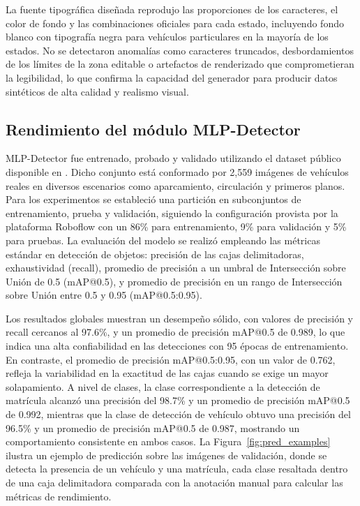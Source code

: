 La fuente tipográfica diseñada reprodujo las proporciones de los caracteres, el color de fondo y las combinaciones oficiales para cada estado, incluyendo fondo blanco con tipografía negra para vehículos particulares en la mayoría de los estados. No se detectaron anomalías como caracteres truncados, desbordamientos de los límites de la zona editable o artefactos de renderizado que comprometieran la legibilidad, lo que confirma la capacidad del generador para producir datos sintéticos de alta calidad y realismo visual.

\subsection*{Rendimiento del módulo MLP-Detector}
MLP-Detector fue entrenado, probado y validado utilizando el dataset público disponible en \cite{roboflow_licenseplate2026}. Dicho conjunto está conformado por 2,559 imágenes de vehículos reales en diversos escenarios como aparcamiento, circulación y primeros planos. Para los experimentos se estableció una partición en subconjuntos de entrenamiento, prueba y validación, siguiendo la configuración provista por la plataforma Roboflow con un 86\% para entrenamiento, 9\% para validación y 5\% para pruebas. La evaluación del modelo se realizó empleando las métricas estándar en detección de objetos: precisión de las cajas delimitadoras, exhaustividad (recall), promedio de precisión a un umbral de Intersección sobre Unión de 0.5 (mAP@0.5), y promedio de precisión en un rango de Intersección sobre Unión entre 0.5 y 0.95 (mAP@0.5:0.95).%

Los resultados globales muestran un desempeño sólido, con valores de precisión y recall cercanos al 97.6\%, y un promedio de precisión mAP@0.5 de 0.989, lo que indica una alta confiabilidad en las detecciones con 95 épocas de entrenamiento. En contraste, el promedio de precisión mAP@0.5:0.95, con un valor de 0.762, refleja la variabilidad en la exactitud de las cajas cuando se exige un mayor solapamiento. A nivel de clases, la clase correspondiente a la detección de matrícula alcanzó una precisión del 98.7\% y un promedio de precisión mAP@0.5 de 0.992, mientras que la clase de detección de vehículo obtuvo una precisión del 96.5\% y un promedio de precisión mAP@0.5 de 0.987, mostrando un comportamiento consistente en ambos casos. La Figura~\ref{fig:pred_examples} ilustra un ejemplo de predicción sobre las imágenes de validación, donde se detecta la presencia de un vehículo y una matrícula, cada clase resaltada dentro de una caja delimitadora comparada con la anotación manual para calcular las métricas de rendimiento.
\vspace{0.5 cm}

